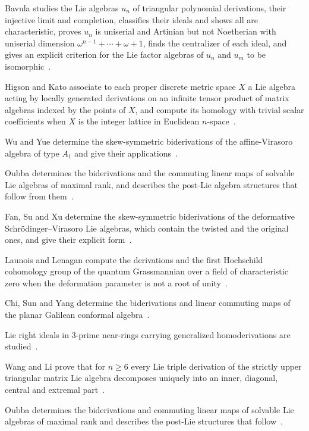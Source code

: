 Bavula studies the Lie algebras $u_n$ of triangular polynomial derivations, their injective limit and completion, classifies their ideals and shows all are characteristic, proves $u_n$ is uniserial and Artinian but not Noetherian with uniserial dimension $\omega^{n-1}+\cdots+\omega+1$, finds the centralizer of each ideal, and gives an explicit criterion for the Lie factor algebras of $u_n$ and $u_m$ to be isomorphic~\cite{WlLieAlgebrasOfTriangularPolynom2012}.

Higson and Kato associate to each proper discrete metric space $X$ a Lie algebra acting by locally generated derivations on an infinite tensor product of matrix algebras indexed by the points of $X$, and compute its homology with trivial scalar coefficients when $X$ is the integer lattice in Euclidean $n$-space~\cite{WlHomologyOfTheLieAlgebraOfLocal2026}.

Wu and Yue determine the skew-symmetric biderivations of the affine-Virasoro algebra of type $A_1$ and give their applications~\cite{WlSkewSymmetricBiderivationsOnTh2022}.

Oubba determines the biderivations and the commuting linear maps of solvable Lie algebras of maximal rank, and describes the post-Lie algebra structures that follow from them~\cite{WlBiderivationsCommutingLinearMa2025}.

Fan, Su and Xu determine the skew-symmetric biderivations of the deformative Schr\"odinger--Virasoro Lie algebras, which contain the twisted and the original ones, and give their explicit form~\cite{WlLinearCommutingMapsAndSkewSymm2016}.

Launois and Lenagan compute the derivations and the first Hochschild cohomology group of the quantum Grassmannian over a field of characteristic zero when the deformation parameter is not a root of unity~\cite{WlDerivationsAndTheFirstHochschi2024}.

Chi, Sun and Yang determine the biderivations and linear commuting maps of the planar Galilean conformal algebra~\cite{WlBiderivationsAndLinearCommutin2018}.

Lie right ideals in 3-prime near-rings carrying generalized homoderivations are studied~\cite{WlLieRightIdealsIn3PrimeNearRing2020}.

Wang and Li prove that for $n\geq 6$ every Lie triple derivation of the strictly upper triangular matrix Lie algebra decomposes uniquely into an inner, diagonal, central and extremal part~\cite{WlLieTripleDerivationOfTheLieAlg2020}.

Oubba determines the biderivations and commuting linear maps of solvable Lie algebras of maximal rank and describes the post-Lie structures that follow~\cite{WlBiderivationsCommutingLinearMa2020}.

